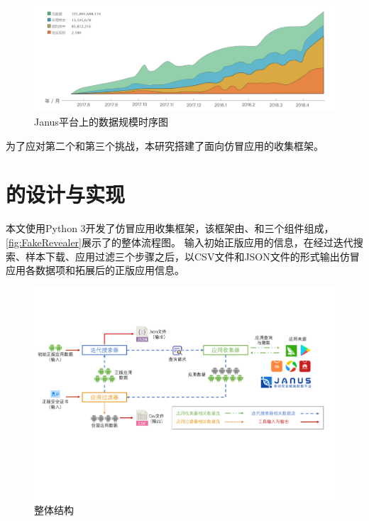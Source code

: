 \begin{figure}[htbp]
	\centering
	\includegraphics[width=\textwidth]{./Figures/edwin-Janus-data.png}
	\caption{Janus平台上的数据规模时序图}
	\label{fig:Janus-data}
	\vspace{-5mm}
\end{figure}

为了应对第二个和第三个挑战，本研究搭建了面向仿冒应用的收集框架\mytool。


\section{\mytool 的设计与实现}

本文使用Python 3开发了仿冒应用收集框架\mytool，该框架由\componentA 、\componentB 和\componentC 三个组件组成，\autoref{fig:FakeRevealer}展示了\mytool 的整体流程图。
输入初始正版应用的信息，\mytool 在经过迭代搜索、样本下载、应用过滤三个步骤之后，以CSV文件和JSON文件的形式输出仿冒应用各数据项和拓展后的正版应用信息。

\begin{figure}[htbp]
	\centering
	\includegraphics[width=\textwidth]{./Figures/edwin-fakerevealer}
	\caption{\mytool 整体结构}
	\label{fig:FakeRevealer}
	\vspace{-3mm}
\end{figure}


